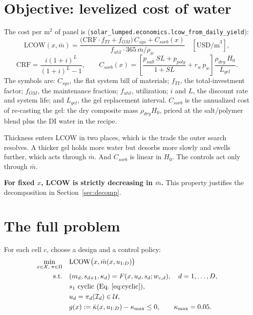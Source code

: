 \documentclass[11pt]{article}
\newcommand{\code}[1]{\texttt{#1}}
\begin{document}
\section{Objective: levelized cost of water}

The cost per m$^2$ of panel is (\code{solar\_lumped.economics.lcow\_from\_daily\_yield}):
\begin{equation}
\mathrm{LCOW}(x, \bar m) =
\frac{\bigl(\mathrm{CRF}\cdot f_{TI} + f_{OM}\bigr)\,C_{sys} + C_{sorb}(x)}
{f_{util}\cdot 365\,\bar m/\rho_w}
\quad [\text{USD/m}^3],
\label{eq:lcow}
\end{equation}
\begin{equation}
\mathrm{CRF} = \frac{i(1+i)^L}{(1+i)^L - 1},
\qquad
C_{sorb}(x) = \left[\frac{p_{salt}\,SL + p_{poly}}{1 + SL} + r_w\,p_{w}\right]
\frac{\rho_{dry}\,H_0}{L_{gel}} .
\label{eq:csorb}
\end{equation}
The symbols are: $C_{sys}$, the flat system bill of materials; $f_{TI}$, the
total-investment factor; $f_{OM}$, the maintenance fraction; $f_{util}$, utilization; $i$
and $L$, the discount rate and system life; and $L_{gel}$, the gel replacement interval.
$C_{sorb}$ is the annualized cost of re-casting the gel: the dry composite mass
$\rho_{dry}H_0$, priced at the salt/polymer blend plus the DI water in the recipe.

Thickness enters LCOW in two places, which is the trade the outer search resolves. A thicker
gel holds more water but desorbs more slowly and swells further, which acts through
$\bar m$. And $C_{sorb}$ is linear in $H_0$. The controls act only through $\bar m$.

\textbf{For fixed $x$, LCOW is strictly decreasing in $\bar m$.} This property justifies
the decomposition in Section~\ref{sec:decomp}.

\section{The full problem}
\label{sec:full}

For each cell $c$, choose a design and a control policy:
\begin{equation}
\begin{aligned}
\min_{x \in \mathcal{X},\; \pi \in \Pi} \quad & \mathrm{LCOW}\bigl(x, \bar m(x, u_{1:D})\bigr) \\
\text{s.t.} \quad & (m_d, s_{d+1}, \kappa_d) = F(x, u_d, s_d; w_{c,d}), \quad d = 1,\dots,D, \\
& s_1 \text{ cyclic (Eq.~\eqref{eq:cyclic})}, \\
& u_d = \pi_d(\mathcal{I}_d) \in \mathcal{U}, \\
& g(x) := \bar\kappa(x, u_{1:D}) - \kappa_{\max} \le 0, \qquad \kappa_{\max} = 0.05 .
\end{aligned}
\label{eq:full}
\end{equation}
\end{document}
